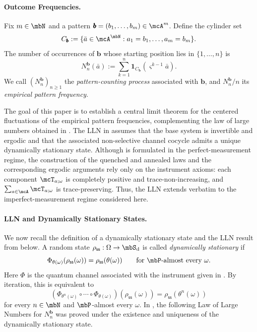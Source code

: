 \documentclass[a4paper]{article}
\numberwithin{equation}{section}   %
\theoremstyle{plain}   %
\theoremstyle{plain}   %
\theoremstyle{examplestyle}
\DeclareMathOperator{\states}{\mbS_d}   %
\DeclareMathOperator{\pr}{\mbP}           %
\newcommand{\s}{\rho_{\mathsf{ss}}}     %
\begin{document}
    \paragraph{Outcome Frequencies.}
        Fix \(m\in\mbN\) and a pattern \(\pmb b=(b_1,\dots,b_m)\in\mcA^m\).
        Define the cylinder set
        \begin{equation}
        \label{eq:cylinder_for_b}
            C_{\pmb b}
            :=
            \{\bar a\in\mcA^\mbN:a_1=b_1,\dots,a_m=b_m\}.
        \end{equation}
        The number of occurrences of \(\pmb b\) whose starting position lies in \(\{1,\dots,n\}\) is
        \[
            N_n^{\pmb b}(\bar a)
            :=
            \sum_{k=1}^n
            \mathbf 1_{C_{\pmb b}}\left(\varsigma^{k-1}\bar a\right).
        \]
        We call \((N_n^{\pmb b})_{n\ge1}\) the \emph{pattern-counting process} associated with \(\pmb b\), and \(N_n^{\pmb b}/n\) its \emph{empirical pattern frequency}.

        \medskip

        The goal of this paper is to establish a central limit theorem for the centered fluctuations of the empirical pattern frequencies, complementing the law of large numbers obtained in \cite{qtlln}.
        The LLN in \cite{qtlln} assumes that the base system is invertible and ergodic and that the associated non-selective channel cocycle admits a unique dynamically stationary state.
        Although \cite{qtlln} is formulated in the perfect-measurement regime,  the construction of the quenched and annealed laws and the corresponding ergodic arguments rely only on the instrument axioms: each component \(\mcT_{a;\omega}\) is completely positive and trace-non-increasing, and \(\sum_{a\in\mcA}\mcT_{a;\omega}\) is trace-preserving. 
        Thus, the LLN extends verbatim to the imperfect-measurement regime considered here.
  
    \paragraph{LLN and Dynamically Stationary States.}
        We now recall the definition of a dynamically stationary state and the LLN result from \cite{qtlln} below. 
        A random state \(\s:\Omega\to\states\) is called \emph{dynamically stationary} if
        \[
            \Phi_{\theta(\omega)}\!\left(\s(\omega)\right)
            =
            \s(\theta(\omega))
            \qquad
            \text{for \(\pr\)-almost every \(\omega\)}.
        \]
        Here $\Phi$ is the quantum channel associated with the instrument given in .
        By iteration, this is equivalent to
        \[
            \left(
                \Phi_{\theta^n(\omega)}
                \circ\cdots\circ
                \Phi_{\theta(\omega)}
            \right)\!\left(\s(\omega)\right)
            =
            \s(\theta^n(\omega))
        \]
        for every \(n\in\mbN\) and \(\pr\)-almost every \(\omega\).
        In \cite{qtlln}, the following Law of Large Numbers for \(N_n^{\pmb b}\) was proved under the existence and uniqueness of the dynamically stationary state.
\end{document}
